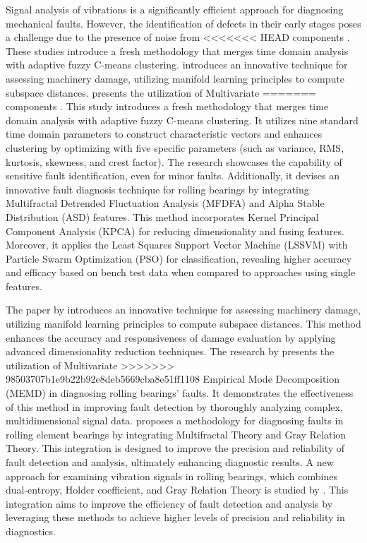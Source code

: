 \documentclass[sn-basic,pdflatex]{sn-jnl}
\theoremstyle{remark}
\theoremstyle{definition}
\begin{document}
Signal analysis of vibrations is a significantly efficient approach for
diagnosing mechanical faults. However, the identification of defects in
their early stages poses a challenge due to the presence of noise from
<<<<<<< HEAD
components \citep{WOS:000369301600001, WOS:000367992900001}. These
studies introduce a fresh methodology that merges time domain analysis
with adaptive fuzzy C-means clustering. \citet{WOS:000366765500038}
introduces an innovative technique for assessing machinery damage,
utilizing manifold learning principles to compute subspace distances.
\citet{WOS:000379556300014} presents the utilization of Multivariate
=======
components \citep[@WOS:000367992900001]{WOS:000369301600001}. This study
introduces a fresh methodology that merges time domain analysis with
adaptive fuzzy C-means clustering. It utilizes nine standard time domain
parameters to construct characteristic vectors and enhances clustering
by optimizing with five specific parameters (such as variance, RMS,
kurtosis, skewness, and crest factor). The research showcases the
capability of sensitive fault identification, even for minor faults.
Additionally, it devises an innovative fault diagnosis technique for
rolling bearings by integrating Multifractal Detrended Fluctuation
Analysis (MFDFA) and Alpha Stable Distribution (ASD) features. This
method incorporates Kernel Principal Component Analysis (KPCA) for
reducing dimensionality and fusing features. Moreover, it applies the
Least Squares Support Vector Machine (LSSVM) with Particle Swarm
Optimization (PSO) for classification, revealing higher accuracy and
efficacy based on bench test data when compared to approaches using
single features.

The paper by \citep{WOS:000366765500038} introduces an innovative
technique for assessing machinery damage, utilizing manifold learning
principles to compute subspace distances. This method enhances the
accuracy and responsiveness of damage evaluation by applying advanced
dimensionality reduction techniques. The research by
\citep{WOS:000379556300014} presents the utilization of Multivariate
>>>>>>> 98503707b1e9b22b92e8deb5669cba8e51ff1108
Empirical Mode Decomposition (MEMD) in diagnosing rolling bearings'
faults. It demonstrates the effectiveness of this method in improving
fault detection by thoroughly analyzing complex, multidimensional signal
data. \citet{WOS:000391229300006} proposes a methodology for diagnosing
faults in rolling element bearings by integrating Multifractal Theory
and Gray Relation Theory. This integration is designed to improve the
precision and reliability of fault detection and analysis, ultimately
enhancing diagnostic results. A new approach for examining vibration
signals in rolling bearings, which combines dual-entropy, Holder
coefficient, and Gray Relation Theory is studied by
\citet{WOS:000426819400027}. This integration aims to improve the
efficiency of fault detection and analysis by leveraging these methods
to achieve higher levels of precision and reliability in diagnostics.
\end{document}
